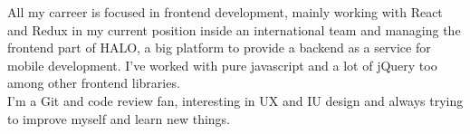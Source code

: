 \documentclass[11pt, a4paper]{awesome-cv} %
\begin{document}
\begin{cvletter}

All my carreer is focused in frontend development, mainly working with React and Redux in my current position inside an international team and managing the frontend part of HALO, a big platform to provide a backend as a service for mobile development.
I've worked with pure javascript and a lot of jQuery too among other frontend libraries.\\
I'm a Git and code review fan, interesting in UX and IU design and always trying to improve myself and learn new things.



\end{cvletter}


\makeletterclosing %
\end{document}
